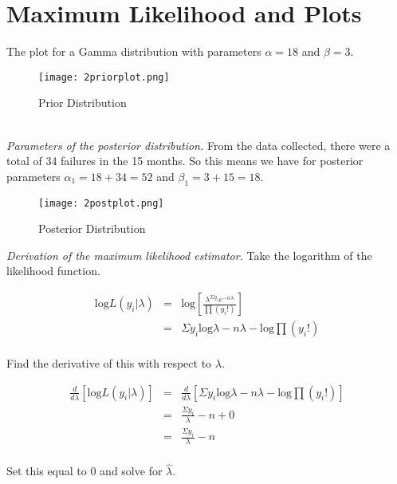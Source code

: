 \documentclass[12pt]{article}
\begin{document}
\section*{Maximum Likelihood and Plots}

\noindent The plot for a Gamma distribution with parameters $\alpha=18$ and $\beta=3$.

\begin{figure}[H]
\begin{center}
\texttt{[image: 2priorplot.png]}
\caption{Prior Distribution}
\end{center}
\end{figure}
\ \\ [2cm]

\noindent \textit{Parameters of the posterior distribution.}  From the data collected, there were a total of 34 failures in the 15 months.  So this means we have for posterior parameters $\alpha_1=18+34=52$ and $\beta_1=3+15=18$.

\begin{figure}[H]
\begin{center}
\texttt{[image: 2postplot.png]}
\caption{Posterior Distribution}
\end{center}
\end{figure}

\noindent \textit{Derivation of the maximum likelihood estimator.}  Take the logarithm of the likelihood function.

\begin{eqnarray*}
\mathrm{log}L(y_i|\lambda) &=& \mathrm{log}\left[\frac{\lambda^{\Sigma y_i}e^{-n\lambda}}{\prod (y_i!)}\right] \\
&=& \Sigma y_i\mathrm{log}\lambda-n\lambda-\mathrm{log}\prod (y_i!) \\
\end{eqnarray*}

\noindent Find the derivative of this with respect to $\lambda$.

\begin{eqnarray*}
\frac{d}{d\lambda}\left[\mathrm{log}L(y_i|\lambda)\right] &=& \frac{d}{d\lambda}\left[\Sigma y_i\mathrm{log}\lambda-n\lambda-\mathrm{log}\prod (y_i!)\right] \\
&=& \frac{\Sigma y_i}{\lambda}-n+0 \\
&=& \frac{\Sigma y_i}{\lambda}-n \\
\end{eqnarray*}

\noindent Set this equal to 0 and solve for $\hat{\lambda}$.
\end{document}
